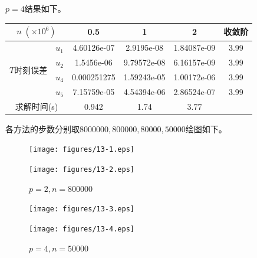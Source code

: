 \documentclass[lang=cn,10pt,bibend=bibtex]{elegantbook}
\begin{document}
$p=4$结果如下。

\vspace{-.8em}
\begin{table}[H]
  \centering
  \renewcommand\arraystretch{0.75}
  \begin{tabular}{cc|ccc|c}
  \multicolumn{2}{c|}{$n\;(\times 10^6)$}                  & 0.5 & 1 & 2  & 收敛阶 \\ \hline
  \multicolumn{1}{c|}{\multirow{4}{*}{$T$时刻误差}} & \multicolumn{1}{c|}{$u_1$} &  4.60126e-07  &   2.9195e-08   & 1.84087e-09    &  3.99   \\
  \multicolumn{1}{c|}{}                         & \multicolumn{1}{c|}{$u_2$} &   1.5456e-06    & 9.79572e-08  & 6.16157e-09    &  3.99   \\
  \multicolumn{1}{c|}{}                         & \multicolumn{1}{c|}{$u_4$} &   0.000251275    & 1.59243e-05  & 1.00172e-06     &  3.99   \\
  \multicolumn{1}{c|}{}                         & \multicolumn{1}{c|}{$u_5$} &   7.15759e-05   & 4.54394e-06  & 2.86524e-07     &  3.99  \\ \hline
  \multicolumn{2}{c|}{求解时间(s)} & 0.942 & 1.74 & 3.77 & 
  \end{tabular}
\end{table}
\vspace{-1em}

各方法的步数分别取$8000000,800000,80000,50000$绘图如下。

\vspace{-1em}
\begin{figure}[H]
  \centering
  \begin{minipage}[t]{0.31\linewidth}
      \centering
      \texttt{[image: figures/13-1.eps]}
      \caption*{\small $p=1,n=8000000$}
  \end{minipage}
  \hspace{2em}
  \begin{minipage}[t]{0.31\linewidth}
      \centering
      \texttt{[image: figures/13-2.eps]}
      \caption*{\small $p=2,n=800000$}
  \end{minipage}
\end{figure}
\vspace{-2em}
\begin{figure}[H]
  \centering
  \begin{minipage}[t]{0.31\linewidth}
    \centering
    \texttt{[image: figures/13-3.eps]}
    \caption*{\small $p=3,n=80000$}
  \end{minipage}
  \hspace{2em}
  \begin{minipage}[t]{0.31\linewidth}
      \centering
      \texttt{[image: figures/13-4.eps]}
      \caption*{\small $p=4,n=50000$}
  \end{minipage}
\end{figure}
\vspace{-1em}
\end{document}
